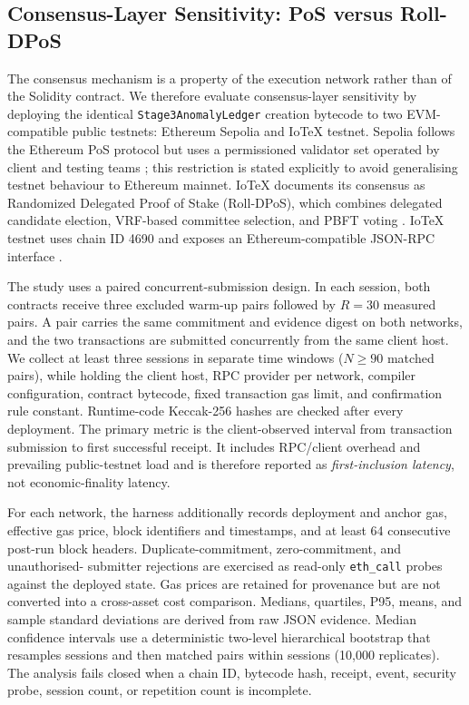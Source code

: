 
\subsection{Consensus-Layer Sensitivity: PoS versus Roll-DPoS}
\label{sec:pos-rolldpos-method}

The consensus mechanism is a property of the execution network rather than of the
Solidity contract. We therefore evaluate consensus-layer sensitivity by deploying
the identical \texttt{Stage3AnomalyLedger} creation bytecode to two EVM-compatible
public testnets: Ethereum Sepolia and IoTeX testnet. Sepolia follows the Ethereum
PoS protocol but uses a permissioned validator set operated by client and testing
teams \cite{ethereumNetworks}; this restriction is stated explicitly to avoid
generalising testnet behaviour to Ethereum mainnet. IoTeX documents its consensus
as Randomized Delegated Proof of Stake (Roll-DPoS), which combines delegated
candidate election, VRF-based committee selection, and PBFT voting
\cite{iotexRollDpos}. IoTeX testnet uses chain ID 4690 and exposes an
Ethereum-compatible JSON-RPC interface \cite{iotexTestnet}.

The study uses a paired concurrent-submission design. In each session, both
contracts receive three excluded warm-up pairs followed by $R=30$ measured pairs.
A pair carries the same commitment and evidence digest on both networks, and the
two transactions are submitted concurrently from the same client host. We collect
at least three sessions in separate time windows ($N\geq90$ matched pairs), while
holding the client host, RPC provider per network, compiler configuration, contract
bytecode, fixed transaction gas limit, and confirmation rule constant. Runtime-code
Keccak-256 hashes are checked after every deployment. The primary metric is the
client-observed interval from transaction submission to first successful receipt.
It includes RPC/client overhead and prevailing public-testnet load and is therefore
reported as \emph{first-inclusion latency}, not economic-finality latency.

For each network, the harness additionally records deployment and anchor gas,
effective gas price, block identifiers and timestamps, and at least 64 consecutive
post-run block headers. Duplicate-commitment, zero-commitment, and unauthorised-
submitter rejections are exercised as read-only \texttt{eth\_call} probes against
the deployed state. Gas prices are retained for provenance but are not converted
into a cross-asset cost comparison. Medians, quartiles, P95, means, and sample
standard deviations are derived from raw JSON evidence. Median confidence intervals
use a deterministic two-level hierarchical bootstrap that resamples sessions and
then matched pairs within sessions (10,000 replicates). The analysis fails closed
when a chain ID, bytecode hash, receipt, event, security probe, session count, or
repetition count is incomplete.

